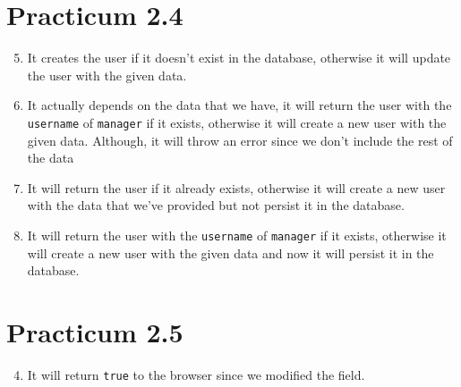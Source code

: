 \documentclass[12pt,titlepage]{article}
\begin{document}
\section{Practicum 2.4}
\begin{enumerate}
    \setcounter{enumi}{4}
    \item {
        It creates the user if it doesn't exist in the database, otherwise it will update the user with the given data.
    }
    \setcounter{enumi}{6}
    \item {
        It actually depends on the data that we have, it will return the user with the \texttt{username} of \texttt{manager} if it exists, otherwise it will create a new user with the given data.
        Although, it will throw an error since we don't include the rest of the data
    }
    \setcounter{enumi}{8}
    \item {
        It will return the user if it already exists, otherwise it will create a new user with the data that we've provided but not persist it in the database.
    }
    \setcounter{enumi}{10}
    \item {
        It will return the user with the \texttt{username} of \texttt{manager} if it exists, otherwise it will create a new user with the given data and now it will persist it in the database.
    }
\end{enumerate}

\section{Practicum 2.5}
\begin{enumerate}
    \setcounter{enumi}{3}
    \item {
        It will return \texttt{true} to the browser since we modified the field.
    }
\end{enumerate}
\end{document}
